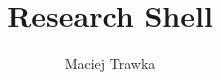 \newcommand {\ShellName}	{Research Shell}

\title	{\ShellName}
\author	{Maciej Trawka}

\newcommand {\aio}	{research\_shell}
\newcommand {\daio}	{research\_shell\_drun}

\newcommand {\Polynomial}	{\texttt{Polynomial}}
\newcommand {\Lfsr}			{\texttt{Lfsr}}
